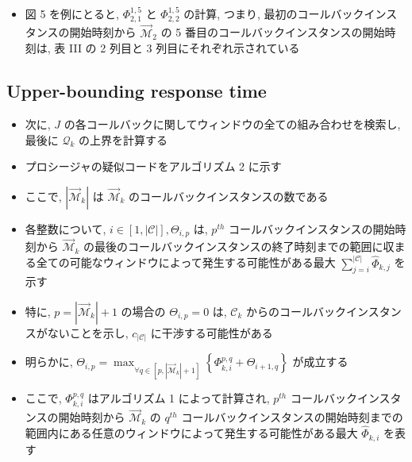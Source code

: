 \begin{frame}{}
    \begin{itemize}
        \item 図 5 を例にとると, $\Phi_{2,1}^{1,5}$ と $\Phi_{2,2}^{1,5}$ の計算, つまり, 最初のコールバックインスタンスの開始時刻から $\overrightarrow{\mathcal{M}}_{2}$ の 5 番目のコールバックインスタンスの開始時刻は, 表 III の 2 列目と 3 列目にそれぞれ示されている
    \end{itemize}
\end{frame}


\subsection{Upper-bounding response time}
\label{ssec: upper bounding response time}

\begin{frame}{}
    \begin{itemize}
        \item 次に, $J$ の各コールバックに関してウィンドウの全ての組み合わせを検索し, 最後に $\mathcal{Q}_{k}$ の上界を計算する
        \item プロシージャの疑似コードをアルゴリズム 2 に示す
        \item ここで, $\left|\overrightarrow{\mathcal{M}}_{k}\right|$ は $\overrightarrow{\mathcal{M}}_{k}$ のコールバックインスタンスの数である
    \end{itemize}
\end{frame}

\begin{frame}{}
    \begin{itemize}
        \item 各整数について, $i \in[1,|\mathcal{C}|], \Theta_{i, p}$ は, $p^{t h}$ コールバックインスタンスの開始時刻から $\overrightarrow{\mathcal{M}}_{k}$ の最後のコールバックインスタンスの終了時刻までの範囲に収まる全ての可能なウィンドウによって発生する可能性がある最大 $\sum_{j=i}^{|\mathcal{C}|} \hat{\Phi}_{k, j}$ を示す
        \item 特に, $p=\left|\overrightarrow{\mathcal{M}}_{k}\right|+1$ の場合の $\Theta_{i, p}=0$ は, $\mathcal{C}_{k}$ からのコールバックインスタンスがないことを示し, $c_{|\mathcal{C}|}$ に干渉する可能性がある
        \item 明らかに, $\Theta_{i, p}=\max _{\forall q \in\left[p,\left|\overrightarrow{\mathcal{M}}_{k}\right|+1\right]}\left\{\Phi_{k, i}^{p, q}+\Theta_{i+1, q}\right\}$ が成立する
        \item ここで, $\Phi_{k, i}^{p, q}$ はアルゴリズム 1 によって計算され, $p^{t h}$ コールバックインスタンスの開始時刻から $\overrightarrow{\mathcal{M}}_{k}$ の $q^{t h}$ コールバックインスタンスの開始時刻までの範囲内にある任意のウィンドウによって発生する可能性がある最大 $\hat{\Phi}_{k, i}$ を表す
    \end{itemize}
\end{frame}

